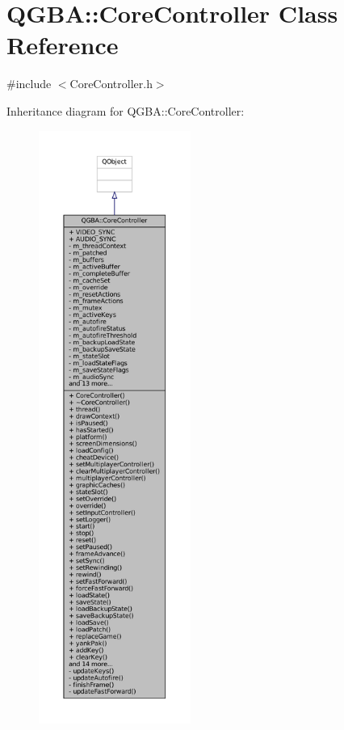 \hypertarget{class_q_g_b_a_1_1_core_controller}{}\section{Q\+G\+BA\+:\+:Core\+Controller Class Reference}
\label{class_q_g_b_a_1_1_core_controller}


{\ttfamily \#include $<$Core\+Controller.\+h$>$}



Inheritance diagram for Q\+G\+BA\+:\+:Core\+Controller\+:
\nopagebreak
\begin{figure}[H]
\begin{center}
\leavevmode
\includegraphics[height=550pt]{class_q_g_b_a_1_1_core_controller__inherit__graph}
\end{center}
\end{figure}


